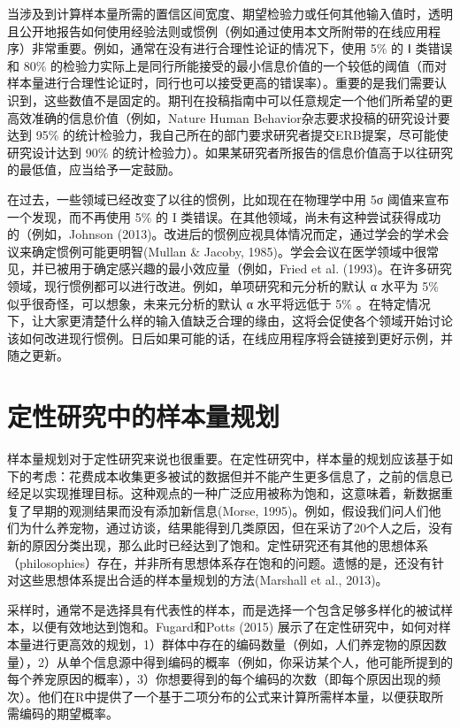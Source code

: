\documentclass[
  letterpaper,
  DIV=11,
  numbers=noendperiod]{scrreprt}
\begin{document}
当涉及到计算样本量所需的置信区间宽度、期望检验力或任何其他输入值时，透明且公开地报告如何使用经验法则或惯例（例如通过使用本文所附带的在线应用程序）非常重要。例如，通常在没有进行合理性论证的情况下，使用
5\% 的 Ⅰ 类错误和 80\%
的检验力实际上是同行所能接受的最小信息价值的一个较低的阈值（而对样本量进行合理性论证时，同行也可以接受更高的错误率）。重要的是我们需要认识到，这些数值不是固定的。期刊在投稿指南中可以任意规定一个他们所希望的更高效准确的信息价值（例如，Nature
Human Behavior杂志要求投稿的研究设计要达到 95\%
的统计检验力，我自己所在的部门要求研究者提交ERB提案，尽可能使研究设计达到
90\%
的统计检验力）。如果某研究者所报告的信息价值高于以往研究的最低值，应当给予一定鼓励。

在过去，一些领域已经改变了以往的惯例，比如现在在物理学中用 5σ
阈值来宣布一个发现，而不再使用 5\% 的 I
类错误。在其他领域，尚未有这种尝试获得成功的（例如，Johnson
(2013)。改进后的惯例应视具体情况而定，通过学会的学术会议来确定惯例可能更明智(Mullan
\& Jacoby,
1985)。学会会议在医学领域中很常见，并已被用于确定感兴趣的最小效应量（例如，Fried
et al.
(1993)。在许多研究领域，现行惯例都可以进行改进。例如，单项研究和元分析的默认
α 水平为 5\% 似乎很奇怪，可以想象，未来元分析的默认 α 水平将远低于 5\%
。在特定情况下，让大家更清楚什么样的输入值缺乏合理的缘由，这将会促使各个领域开始讨论该如何改进现行惯例。日后如果可能的话，在线应用程序将会链接到更好示例，并随之更新。

\hypertarget{ux5b9aux6027ux7814ux7a76ux4e2dux7684ux6837ux672cux91cfux89c4ux5212}{%
\section{定性研究中的样本量规划}\label{ux5b9aux6027ux7814ux7a76ux4e2dux7684ux6837ux672cux91cfux89c4ux5212}}

样本量规划对于定性研究来说也很重要。在定性研究中，样本量的规划应该基于如下的考虑：花费成本收集更多被试的数据但并不能产生更多信息了，之前的信息已经足以实现推理目标。这种观点的一种广泛应用被称为饱和，这意味着，新数据重复了早期的观测结果而没有添加新信息(Morse,
1995)。例如，假设我们问人们他们为什么养宠物，通过访谈，结果能得到几类原因，但在采访了20个人之后，没有新的原因分类出现，那么此时已经达到了饱和。定性研究还有其他的思想体系（philosophies）存在，并非所有思想体系存在饱和的问题。遗憾的是，还没有针对这些思想体系提出合适的样本量规划的方法(Marshall
et al., 2013)。

采样时，通常不是选择具有代表性的样本，而是选择一个包含足够多样化的被试样本，以便有效地达到饱和。Fugard和Potts
(2015)
展示了在定性研究中，如何对样本量进行更高效的规划，1）群体中存在的编码数量（例如，人们养宠物的原因数量），2）从单个信息源中得到编码的概率（例如，你采访某个人，他可能所提到的每个养宠原因的概率），3）你想要得到的每个编码的次数（即每个原因出现的频次）。他们在R中提供了一个基于二项分布的公式来计算所需样本量，以便获取所需编码的期望概率。
\end{document}

